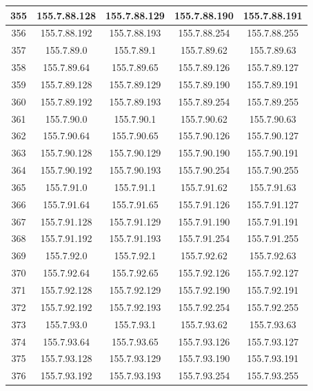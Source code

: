 \documentclass[letterpaper,12pt]{article}
\begin{document}
\begin{longtable}{|c|c|c|c|c|}
        355 & 155.7.88.128 & 155.7.88.129 & 155.7.88.190 & 155.7.88.191 \\ \hline
        356 & 155.7.88.192 & 155.7.88.193 & 155.7.88.254 & 155.7.88.255 \\ \hline
        357 & 155.7.89.0 & 155.7.89.1 & 155.7.89.62 & 155.7.89.63 \\ \hline
        358 & 155.7.89.64 & 155.7.89.65 & 155.7.89.126 & 155.7.89.127 \\ \hline
        359 & 155.7.89.128 & 155.7.89.129 & 155.7.89.190 & 155.7.89.191 \\ \hline
        360 & 155.7.89.192 & 155.7.89.193 & 155.7.89.254 & 155.7.89.255 \\ \hline
        361 & 155.7.90.0 & 155.7.90.1 & 155.7.90.62 & 155.7.90.63 \\ \hline
        362 & 155.7.90.64 & 155.7.90.65 & 155.7.90.126 & 155.7.90.127 \\ \hline
        363 & 155.7.90.128 & 155.7.90.129 & 155.7.90.190 & 155.7.90.191 \\ \hline
        364 & 155.7.90.192 & 155.7.90.193 & 155.7.90.254 & 155.7.90.255 \\ \hline
        365 & 155.7.91.0 & 155.7.91.1 & 155.7.91.62 & 155.7.91.63 \\ \hline
        366 & 155.7.91.64 & 155.7.91.65 & 155.7.91.126 & 155.7.91.127 \\ \hline
        367 & 155.7.91.128 & 155.7.91.129 & 155.7.91.190 & 155.7.91.191 \\ \hline
        368 & 155.7.91.192 & 155.7.91.193 & 155.7.91.254 & 155.7.91.255 \\ \hline
        369 & 155.7.92.0 & 155.7.92.1 & 155.7.92.62 & 155.7.92.63 \\ \hline
        370 & 155.7.92.64 & 155.7.92.65 & 155.7.92.126 & 155.7.92.127 \\ \hline
        371 & 155.7.92.128 & 155.7.92.129 & 155.7.92.190 & 155.7.92.191 \\ \hline
        372 & 155.7.92.192 & 155.7.92.193 & 155.7.92.254 & 155.7.92.255 \\ \hline
        373 & 155.7.93.0 & 155.7.93.1 & 155.7.93.62 & 155.7.93.63 \\ \hline
        374 & 155.7.93.64 & 155.7.93.65 & 155.7.93.126 & 155.7.93.127 \\ \hline
        375 & 155.7.93.128 & 155.7.93.129 & 155.7.93.190 & 155.7.93.191 \\ \hline
        376 & 155.7.93.192 & 155.7.93.193 & 155.7.93.254 & 155.7.93.255 \\ \hline

\end{longtable}
\end{document}
